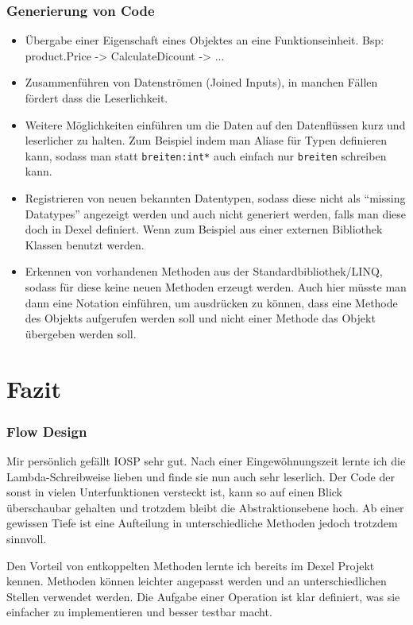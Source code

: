\subsubsection{Generierung von Code}
\begin{itemize}
	\item Übergabe einer Eigenschaft eines Objektes an eine Funktionseinheit.
	Bsp: product.Price -> CalculateDicount -> ...				 
	\item Zusammenführen von Datenströmen (Joined Inputs), in manchen Fällen fördert dass die Leserlichkeit.
	\item Weitere Möglichkeiten einführen um die Daten auf den Datenflüssen kurz und leserlicher zu halten.
	Zum Beispiel indem man  Aliase für Typen definieren kann, sodass man statt \texttt{breiten:int*} auch einfach nur \texttt{breiten} schreiben kann. 
	\item Registrieren  von neuen bekannten Datentypen, sodass diese nicht als \enquote{missing Datatypes} angezeigt werden und auch nicht 
	generiert werden, falls man diese doch in Dexel definiert.
	Wenn zum Beispiel aus einer externen Bibliothek  Klassen benutzt werden.
	\item Erkennen von vorhandenen Methoden aus der Standardbibliothek/LINQ, sodass für diese keine neuen Methoden erzeugt werden.
	Auch hier müsste man dann eine Notation einführen, um ausdrücken zu können, dass eine Methode des Objekts aufgerufen werden soll und nicht einer Methode das Objekt übergeben werden soll.	
\end{itemize}


\section{Fazit}

\subsubsection{Flow Design}
Mir persönlich gefällt IOSP sehr gut. Nach einer Eingewöhnungszeit lernte ich die Lambda-Schreibweise lieben und finde sie nun auch sehr leserlich. Der Code der sonst in vielen Unterfunktionen versteckt ist, kann so auf einen Blick überschaubar gehalten und trotzdem bleibt die Abstraktionsebene hoch. Ab einer gewissen Tiefe ist eine Aufteilung in unterschiedliche Methoden jedoch trotzdem sinnvoll.

Den Vorteil von entkoppelten Methoden lernte ich bereits im Dexel Projekt kennen. Methoden können leichter angepasst werden und an unterschiedlichen Stellen verwendet werden. Die Aufgabe einer Operation ist klar definiert, was sie einfacher zu implementieren und besser testbar macht. 


